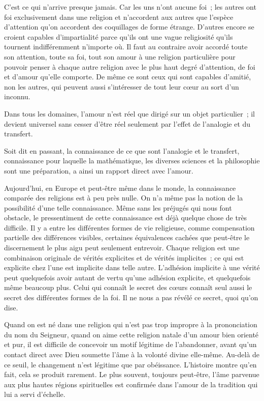 \documentclass[french,twoside]{book} %
\begin{document}
C'est ce qui n'arrive presque jamais. Car les uns n'ont aucune foi ; les autres ont foi exclusivement dans une religion et n'accordent aux autres que l'espèce d'attention qu'on accordent des coquillages de forme étrange. D'autres encore se croient capables d'impartialité parce qu'ils ont une vague religiosité qu'ils tournent indifféremment n'importe où. Il faut au contraire avoir accordé toute son attention, toute sa foi, tout son amour à une religion particulière pour pouvoir penser à chaque autre religion avec le plus haut degré d'attention, de foi et d'amour qu'elle comporte. De même ce sont ceux qui sont capables d'amitié, non les autres, qui peuvent aussi s'intéresser de tout leur cœur au sort d'un inconnu.\par
Dans tous les domaines, l'amour n'est réel que dirigé sur un objet particulier ; il devient universel sans cesser d'être réel seulement par l'effet de l'analogie et du transfert.\par
Soit dit en passant, la connaissance de ce que sont l'analogie et le transfert, connaissance pour laquelle la mathématique, les diverses sciences et la philosophie sont une préparation, a ainsi un rapport direct avec l'amour.\par
Aujourd'hui, en Europe et peut-être même dans le monde, la connaissance comparée des religions est à peu près nulle. On n'a même pas la notion de la possibilité d'une telle connaissance. Même sans les préjugés qui nous font obstacle, le pressentiment de cette connaissance est déjà quelque chose de très difficile. Il y a entre les différentes formes de vie religieuse, comme compensation partielle des différences visibles, certaines équivalences cachées que peut-être le discernement le plus aigu peut seulement entrevoir. Chaque religion est une combinaison originale de vérités explicites et de vérités implicites ; ce qui est explicite chez l'une est implicite dans telle autre. L'adhésion implicite à une vérité peut quelquefois avoir autant de vertu qu'une adhésion explicite, et quelquefois même beaucoup plus. Celui qui connaît le secret des cœurs connaît seul aussi le secret des différentes formes de la foi. Il ne nous a pas révélé ce secret, quoi qu'on dise.\par
Quand on est né dans une religion qui n'est pas trop impropre à la prononciation du nom du Seigneur, quand on aime cette religion natale d'un amour bien orienté et pur, il est difficile de concevoir un motif légitime de l'abandonner, avant qu'un contact direct avec Dieu soumette l'âme à la volonté divine elle-même. Au-delà de ce seuil, le changement n'est légitime que par obéissance. L'histoire montre qu'en fait, cela se produit rarement. Le plus souvent, toujours peut-être, l'âme parvenue aux plus hautes régions spirituelles est confirmée dans l'amour de la tradition qui lui a servi d'échelle.\par
\end{document}
